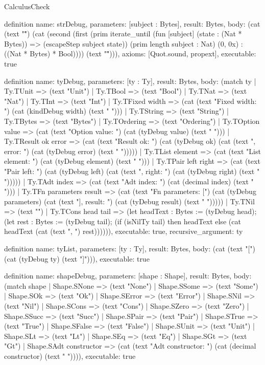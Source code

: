 \begin{lexlean}{CalculusCheck}
\begin{semanticmodule}
definition{
  name: strDebug,
  parameters: [subject : Bytes],
  result: Bytes,
  body: (cat (text "\"") (cat (second (first (prim iterate_until (fun [subject] (state : (Nat * Bytes)) => (escapeStep subject state)) (prim length subject : Nat) (0, 0x) : ((Nat * Bytes) * Bool)))) (text "\""))),
  axioms: [Quot.sound, propext],
  executable: true
}

definition{
  name: tyDebug,
  parameters: [ty : Ty],
  result: Bytes,
  body: (match ty
    | Ty.TUnit => (text "Unit")
    | Ty.TBool => (text "Bool")
    | Ty.TNat => (text "Nat")
    | Ty.TInt => (text "Int")
    | Ty.TFixed width => (cat (text "Fixed { width: ") (cat (kindDebug width) (text " }")))
    | Ty.TString => (text "String")
    | Ty.TBytes => (text "Bytes")
    | Ty.TOrdering => (text "Ordering")
    | Ty.TOption value => (cat (text "Option { value: ") (cat (tyDebug value) (text " }")))
    | Ty.TResult ok error => (cat (text "Result { ok: ") (cat (tyDebug ok) (cat (text ", error: ") (cat (tyDebug error) (text " }")))))
    | Ty.TList element => (cat (text "List { element: ") (cat (tyDebug element) (text " }")))
    | Ty.TPair left right => (cat (text "Pair { left: ") (cat (tyDebug left) (cat (text ", right: ") (cat (tyDebug right) (text " }")))))
    | Ty.TAdt index => (cat (text "Adt { index: ") (cat (decimal index) (text " }")))
    | Ty.TFn parameters result => (cat (text "Fn { parameters: [") (cat (tyDebug parameters) (cat (text "], result: ") (cat (tyDebug result) (text " }")))))
    | Ty.TNil => (text "")
    | Ty.TCons head tail => (let headText : Bytes := (tyDebug head); (let rest : Bytes := (tyDebug tail); (if (isNilTy tail) then headText else (cat headText (cat (text ", ") rest)))))),
  executable: true,
  recursive_argument: ty
}

definition{
  name: tyList,
  parameters: [ty : Ty],
  result: Bytes,
  body: (cat (text "[") (cat (tyDebug ty) (text "]"))),
  executable: true
}

definition{
  name: shapeDebug,
  parameters: [shape : Shape],
  result: Bytes,
  body: (match shape
    | Shape.SNone => (text "None")
    | Shape.SSome => (text "Some")
    | Shape.SOk => (text "Ok")
    | Shape.SError => (text "Error")
    | Shape.SNil => (text "Nil")
    | Shape.SCons => (text "Cons")
    | Shape.SZero => (text "Zero")
    | Shape.SSucc => (text "Succ")
    | Shape.SPair => (text "Pair")
    | Shape.STrue => (text "True")
    | Shape.SFalse => (text "False")
    | Shape.SUnit => (text "Unit")
    | Shape.SLt => (text "Lt")
    | Shape.SEq => (text "Eq")
    | Shape.SGt => (text "Gt")
    | Shape.SAdt constructor => (cat (text "Adt { constructor: ") (cat (decimal constructor) (text " }")))),
  executable: true
}


\end{semanticmodule}
\end{lexlean}
